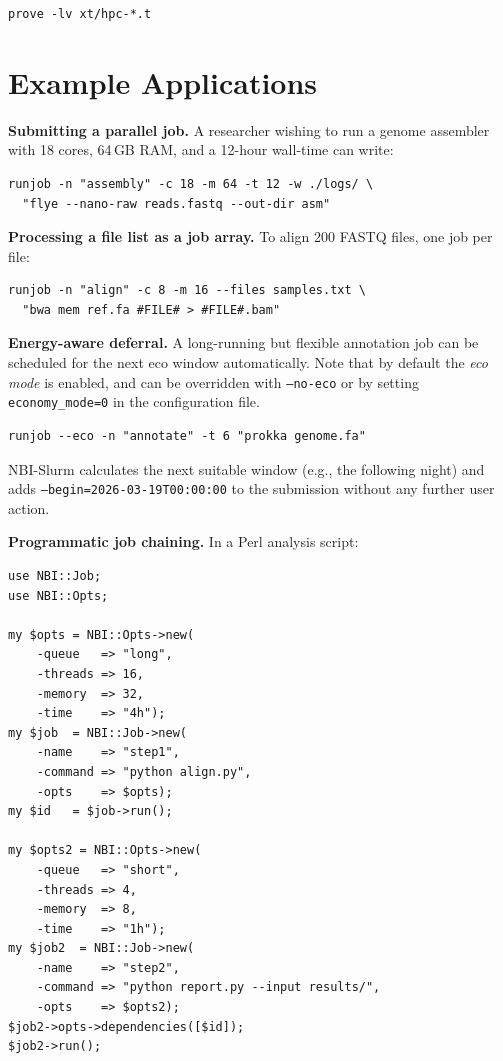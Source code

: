 \documentclass[11pt,a4paper]{article}
\begin{document}
\begin{lstlisting}[style=bash]
prove -lv xt/hpc-*.t
\end{lstlisting}

\section{Example Applications}

\textbf{Submitting a parallel job.}
A researcher wishing to run a genome assembler with 18 cores, 64\,GB RAM, and a 12-hour
wall-time can write:

\begin{lstlisting}[style=bash]
runjob -n "assembly" -c 18 -m 64 -t 12 -w ./logs/ \
  "flye --nano-raw reads.fastq --out-dir asm"
\end{lstlisting}

\textbf{Processing a file list as a job array.}
To align 200 FASTQ files, one job per file:

\begin{lstlisting}[style=bash]
runjob -n "align" -c 8 -m 16 --files samples.txt \
  "bwa mem ref.fa #FILE# > #FILE#.bam"
\end{lstlisting}

\textbf{Energy-aware deferral.}
A long-running but flexible annotation job can be scheduled for the next eco window
automatically. Note that by default the \emph{eco mode} is enabled, and can be overridden with
\texttt{--no-eco} or by setting \texttt{economy\_mode=0} in the configuration file.

\begin{lstlisting}[style=bash]
runjob --eco -n "annotate" -t 6 "prokka genome.fa"
\end{lstlisting}

NBI-Slurm calculates the next suitable window (e.g., the following night) and adds
\texttt{--begin=2026-03-19T00:00:00} to the submission without any further user action.

\textbf{Programmatic job chaining.}
In a Perl analysis script:

\begin{lstlisting}[style=perl]
use NBI::Job;
use NBI::Opts;

my $opts = NBI::Opts->new(
    -queue   => "long",
    -threads => 16,
    -memory  => 32,
    -time    => "4h");
my $job  = NBI::Job->new(
    -name    => "step1",
    -command => "python align.py",
    -opts    => $opts);
my $id   = $job->run();

my $opts2 = NBI::Opts->new(
    -queue   => "short",
    -threads => 4,
    -memory  => 8,
    -time    => "1h");
my $job2  = NBI::Job->new(
    -name    => "step2",
    -command => "python report.py --input results/",
    -opts    => $opts2);
$job2->opts->dependencies([$id]);
$job2->run();
\end{lstlisting}
\end{document}
